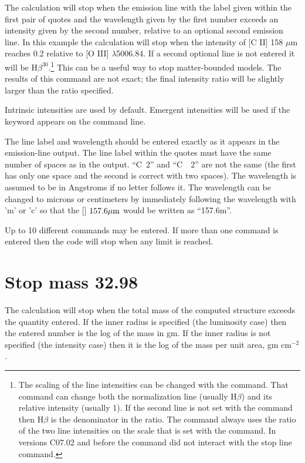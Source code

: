 The calculation will stop when the emission line with the label given
within the first pair of quotes and the wavelength given by
the first number
exceeds an intensity given by the second number, relative to an optional
second emission line.
In this example the calculation will stop when the
intensity of [C II] 158 $\mu $m reaches 0.2 relative to [O III] $\lambda$5006.84.
If a second
optional line is not entered it will be H$\beta^{30}$.\footnote{The scaling of the line intensities can be changed with the
command.
That command can change both the
normalization line (usually H$\beta$) and its relative intensity
(usually 1).
If the second line is not set with the  command
then
H$\beta$ is the
denominator in the ratio.
The  command always uses the ratio of
the two line intensities on the scale that is set with the
 command.
In versions C07.02 and before the  command
did not interact with
the stop line command.}
This can be a useful way
to stop matter-bounded models.
The results of this command are not exact;
the final intensity ratio will be slightly larger than the ratio specified.

Intrinsic intensities are used by default.
Emergent intensities will be used if the keyword
 appears on the command line.

The line label and wavelength should be entered exactly as it appears
in the emission-line output.
The line label within the quotes must have
the same number of spaces as in the output.
``C~2'' and ``C~~2'' are not the same (the first has only one space
and the second is correct with two spaces).
The wavelength is assumed to be in Angstroms if no letter
follows it.
The wavelength can be changed to microns or centimeters by immediately
following the wavelength with 'm' or 'c' so that
the [\cii ] $157.6\hbox{$\mu$m}$ would be written as ``157.6m''.

Up to 10 different  commands may be entered.
If more than one
 command is entered then the code
will stop when any limit is reached.

\section{Stop mass 32.98}

The calculation will stop when the total mass of the computed structure
exceeds the quantity entered.  If the inner radius is specified (the
luminosity case) then the entered number is the log of the mass in gm.
If the inner radius is not specified (the intensity case) then it is the
log of the mass per unit area, gm cm$^{-2}$.

